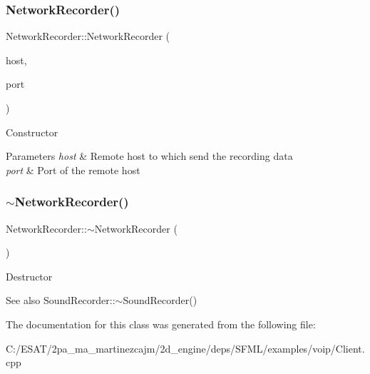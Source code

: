 \subsubsection{\texorpdfstring{Network\+Recorder()}{NetworkRecorder()}}
{\footnotesize\ttfamily Network\+Recorder\+::\+Network\+Recorder (\begin{DoxyParamCaption}\item[{const \hyperlink{classsf_1_1_ip_address}{sf\+::\+Ip\+Address} \&}]{host,  }\item[{unsigned short}]{port }\end{DoxyParamCaption})\hspace{0.3cm}{\ttfamily [inline]}}

Constructor


\begin{DoxyParams}{Parameters}
{\em host} & Remote host to which send the recording data \\
\hline
{\em port} & Port of the remote host \\
\hline
\end{DoxyParams}
\mbox{\label{class_network_recorder_a3df2a0d4bc3576cd8c745d34bf2cdfe2}} 
\subsubsection{\texorpdfstring{$\sim$\+Network\+Recorder()}{~NetworkRecorder()}}
{\footnotesize\ttfamily Network\+Recorder\+::$\sim$\+Network\+Recorder (\begin{DoxyParamCaption}{ }\end{DoxyParamCaption})\hspace{0.3cm}{\ttfamily [inline]}}

Destructor

\begin{DoxySeeAlso}{See also}
Sound\+Recorder\+::$\sim$\+Sound\+Recorder() 
\end{DoxySeeAlso}


The documentation for this class was generated from the following file\+:\begin{DoxyCompactItemize}
\item 
C\+:/\+E\+S\+A\+T/2pa\+\_\+ma\+\_\+martinezcajm/2d\+\_\+engine/deps/\+S\+F\+M\+L/examples/voip/Client.\+cpp\end{DoxyCompactItemize}
